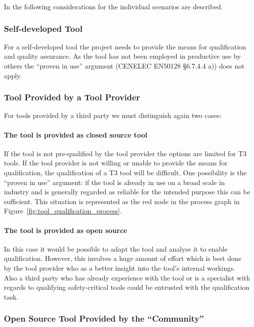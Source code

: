 In the following considerations for the individual scenarios are described.

\subsubsection{Self-developed Tool}

For a self-developed tool the project needs to provide the means for qualification and quality assurance. As the tool has not been employed in productive use by others the ``proven in use'' argument (CENELEC EN50128 §6.7.4.4 a)) does not apply.

\subsubsection{Tool Provided by a Tool Provider}

For tools provided by a third party we must distinguish again two cases:

\paragraph{The tool is provided as closed source tool}

If the tool is not pre-qualified by the tool provider the options are limited for T3 tools. If the tool provider is not willing or unable to provide the means for qualification, the qualification of a T3 tool will be difficult. One possibility is the ``proven in use'' argument: if the tool is already in use on a broad scale in industry and is generally regarded as reliable for the intended purpose this can be sufficient. This situation is represented as the red node in the process graph in Figure~\ref{fig:tool_qualification_process}.

\paragraph{The tool is provided as open source}

In this case it would be possible to adapt the tool and analyse it to enable qualification. However, this involves a huge amount of effort which is best done by the tool provider who as a better insight into the tool's internal workings. Also a third party who has already experience with the tool or is a specialist with regards to qualifying safety-critical tools could be entrusted with the qualification task.

\subsubsection{Open Source Tool Provided by the ``Community''}

